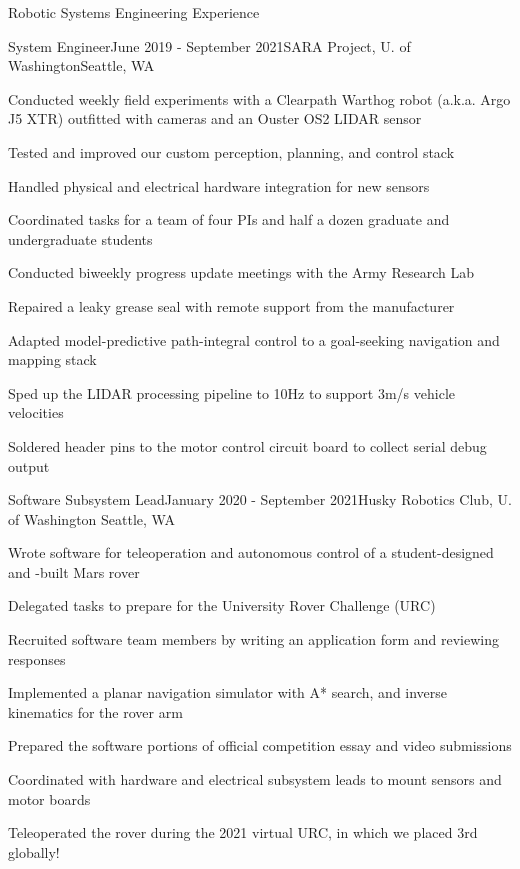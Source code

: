 \documentclass{resume} %
\begin{document}
\begin{rSection}{Robotic Systems Engineering Experience}
\begin{rSubsection}{System Engineer}{June 2019 - September 2021}{SARA Project, U. of Washington}{Seattle, WA}
\item Conducted weekly field experiments with a Clearpath Warthog robot (a.k.a. Argo J5 XTR) outfitted with cameras and an Ouster OS2 LIDAR sensor
\item Tested and improved our custom perception, planning, and control stack
\item Handled physical and electrical hardware integration for new sensors
\item Coordinated tasks for a team of four PIs and half a dozen graduate and undergraduate students
\item Conducted biweekly progress update meetings with the Army Research Lab
\item Repaired a leaky grease seal with remote support from the manufacturer
\item Adapted model-predictive path-integral control to a goal-seeking navigation and mapping stack
\item Sped up the LIDAR processing pipeline to 10Hz to support 3m/s vehicle velocities
\item Soldered header pins to the motor control circuit board to collect serial debug output
\end{rSubsection}

\begin{rSubsection}{Software Subsystem Lead}{January 2020 - September 2021}{Husky Robotics Club, U. of Washington}{ Seattle, WA}
\item Wrote software for teleoperation and autonomous control of a student-designed and -built Mars rover
\item Delegated tasks to prepare for the University Rover Challenge (URC)
\item Recruited software team members by writing an application form and reviewing responses
\item Implemented a planar navigation simulator with A* search, and inverse kinematics for the rover arm
\item Prepared the software portions of official competition essay and video submissions
\item Coordinated with hardware and electrical subsystem leads to mount sensors and motor boards
\item Teleoperated the rover during the 2021 virtual URC, in which we placed 3rd globally!
\end{rSubsection}

\end{rSection}
\end{document}
